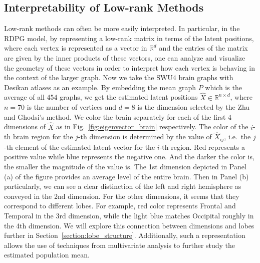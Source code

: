 \subsection{Interpretability of Low-rank Methods}
\label{sec:interpretability}

Low-rank methods can often be more easily interpreted.
In particular, in the RDPG model, by representing a low-rank matrix in terms of the latent positions, where each vertex is represented as a vector in $\mathbb{R}^d$ and the entries of the matrix are given by the inner products of these vectors, one can analyze and visualize the geometry of these vectors in order to interpret how each vertex is behaving in the context of the larger graph. 
Now we take the SWU4 brain graphs with Desikan atlases as an example. By embedding the mean graph $P$ which is the average of all 454 graphs, we get the estimated latent positions $\hat{X} \in \mathbb{R}^{n \times d}$, where $n=70$ is the number of vertices and $d = 8$ is the dimension selected by the Zhu and Ghodsi's method.
We color the brain separately for each of the first 4 dimensions of $\hat{X}$ as in Fig.~\ref{fig:eigenvector_brain} respectively. The color of the $i$-th brain region for the $j$-th dimension is determined by the value of $\hat{X}_{ij}$, i.e.\ the $j$-th element of the estimated latent vector for the $i$-th region. Red represents a positive value while blue represents the negative one. And the darker the color is, the smaller the magnitude of the value is.
The 1st dimension depicted in Panel (a) of the figure provides an average level of the entire brain. Then in Panel (b) particularly, we can see a clear distinction of the left and right hemisphere as conveyed in the 2nd dimension. For the other dimensions, it seems that they correspond to different lobes. For example, red color represents Frontal and Temporal in the 3rd dimension, while the light blue matches Occipital roughly in the 4th dimension. We will explore this connection between dimensions and lobes further in Section~\ref{section:lobe_structure}. Additionally, such a representation allows the use of techniques from multivariate analysis to further study the estimated population mean.
 
